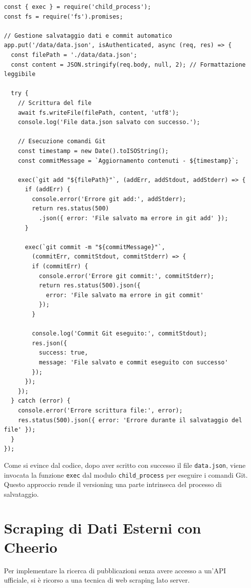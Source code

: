 \begin{verbatim}
const { exec } = require('child_process');
const fs = require('fs').promises;

// Gestione salvataggio dati e commit automatico
app.put('/data/data.json', isAuthenticated, async (req, res) => {
  const filePath = './data/data.json';
  const content = JSON.stringify(req.body, null, 2); // Formattazione leggibile
  
  try {
    // Scrittura del file
    await fs.writeFile(filePath, content, 'utf8');
    console.log('File data.json salvato con successo.');

    // Esecuzione comandi Git
    const timestamp = new Date().toISOString();
    const commitMessage = `Aggiornamento contenuti - ${timestamp}`;
    
    exec(`git add "${filePath}"`, (addErr, addStdout, addStderr) => {
      if (addErr) {
        console.error('Errore git add:', addStderr);
        return res.status(500)
          .json({ error: 'File salvato ma errore in git add' });
      }
      
      exec(`git commit -m "${commitMessage}"`, 
        (commitErr, commitStdout, commitStderr) => {
        if (commitErr) {
          console.error('Errore git commit:', commitStderr);
          return res.status(500).json({ 
            error: 'File salvato ma errore in git commit' 
          });
        }
        
        console.log('Commit Git eseguito:', commitStdout);
        res.json({ 
          success: true, 
          message: 'File salvato e commit eseguito con successo' 
        });
      });
    });
  } catch (error) {
    console.error('Errore scrittura file:', error);
    res.status(500).json({ error: 'Errore durante il salvataggio del file' });
  }
});
\end{verbatim}

Come si evince dal codice, dopo aver scritto con successo il file \texttt{data.json}, viene invocata la funzione \texttt{exec} dal modulo \texttt{child\_process} per eseguire i comandi Git. Questo approccio rende il versioning una parte intrinseca del processo di salvataggio.

\section{Scraping di Dati Esterni con Cheerio}
Per implementare la ricerca di pubblicazioni senza avere accesso a un'API ufficiale, si è ricorso a una tecnica di web scraping lato server.


